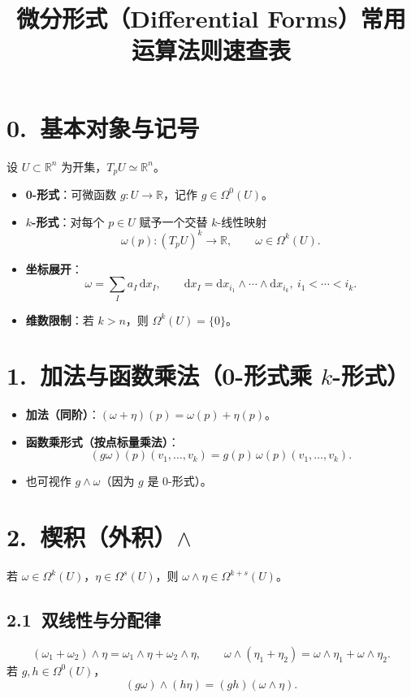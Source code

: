 \documentclass[11pt,a4paper]{article}
\title{微分形式（Differential Forms）常用运算法则速查表}
\author{}
\date{}
\newcommand{\R}{\mathbb{R}}
\newcommand{\Om}{\Omega}
\newcommand{\dx}{\mathrm{d}x}
\begin{document}
\maketitle

\section*{0.\ 基本对象与记号}
设 $U\subset \R^n$ 为开集，$T_pU\simeq \R^n$。
\begin{itemize}
  \item \textbf{0-形式}：可微函数 $g:U\to\R$，记作 $g\in \Om^0(U)$。
  \item \textbf{$k$-形式}：对每个 $p\in U$ 赋予一个交替 $k$-线性映射
  \[
  \omega(p):(T_pU)^k\to \R,\qquad \omega\in \Om^k(U).
  \]
  \item \textbf{坐标展开}：
  \[
  \omega=\sum_{I} a_I\, \dx_I,\qquad
  \dx_I=\dx_{i_1}\wedge\cdots\wedge \dx_{i_k},\ i_1<\cdots<i_k.
  \]
  \item \textbf{维数限制}：若 $k>n$，则 $\Om^k(U)=\{0\}$。
\end{itemize}

\section*{1.\ 加法与函数乘法（0-形式乘 $k$-形式）}
\begin{itemize}
  \item \textbf{加法（同阶）}：$(\omega+\eta)(p)=\omega(p)+\eta(p)$。
  \item \textbf{函数乘形式（按点标量乘法）}：
  \[
  (g\omega)(p)(v_1,\dots,v_k)=g(p)\,\omega(p)(v_1,\dots,v_k).
  \]
  \item 也可视作 $g\wedge \omega$（因为 $g$ 是 0-形式）。
\end{itemize}

\section*{2.\ 楔积（外积）$\wedge$}
若 $\omega\in\Om^k(U)$，$\eta\in\Om^s(U)$，则 $\omega\wedge\eta\in\Om^{k+s}(U)$。

\subsection*{2.1\ 双线性与分配律}
\[
(\omega_1+\omega_2)\wedge\eta=\omega_1\wedge\eta+\omega_2\wedge\eta,\qquad
\omega\wedge(\eta_1+\eta_2)=\omega\wedge\eta_1+\omega\wedge\eta_2.
\]
若 $g,h\in\Om^0(U)$，
\[
(g\omega)\wedge(h\eta)=(gh)(\omega\wedge\eta).
\]
\end{document}
